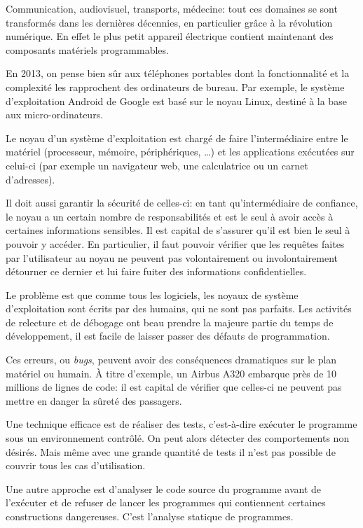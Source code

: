 Communication,
audiovisuel,
transports,
médecine:
tout ces domaines se sont transformés dans les dernières décennies,
en particulier grâce à la révolution numérique.
En effet le plus petit appareil électrique contient maintenant des composants
matériels programmables.

En 2013, on pense bien sûr aux téléphones portables dont la fonctionnalité et la
complexité les rapprochent des ordinateurs de bureau. Par exemple, le système
d'exploitation Android de Google est basé sur le noyau Linux, destiné à la base
aux micro-ordinateurs.

Le noyau d'un système d'exploitation est chargé de faire l'intermédiaire entre
le matériel (processeur, mémoire, périphériques, …) et les applications
exécutées sur celui-ci (par exemple un navigateur web, une calculatrice ou un
carnet d'adresses).

Il doit aussi garantir la sécurité de celles-ci: en tant qu'intermédiaire de
confiance, le noyau a un certain nombre de responsabilités et est le seul à
avoir accès à certaines informations sensibles. Il est capital de s'assurer
qu'il est bien le seul à pouvoir y accéder. En particulier, il faut pouvoir
vérifier que les requêtes faites par l'utilisateur au noyau ne peuvent pas
volontairement ou involontairement détourner ce dernier et lui faire fuiter des
informations confidentielles.

Le problème est que comme tous les logiciels, les noyaux de système
d'exploitation sont écrits par des humains, qui ne sont pas parfaits. Les
activités de relecture et de débogage ont beau prendre la majeure partie du
temps de développement, il est facile de laisser passer des défauts de
programmation.

Ces erreurs, ou \emph{bugs}, peuvent avoir des conséquences dramatiques sur le
plan matériel ou humain. À titre d'exemple, un Airbus A320 embarque près de 10
millions de lignes de code: il est capital de vérifier que celles-ci ne peuvent
pas mettre en danger la sûreté des passagers.

Une technique efficace est de réaliser des tests, c'est-à-dire exécuter le
programme sous un environnement contrôlé. On peut alors détecter des
comportements non désirés. Mais même avec une grande quantité de tests il n'est
pas possible de couvrir tous les cas d'utilisation.

Une autre approche est d'analyser le code source du programme avant de
l'exécuter et de refuser de lancer les programmes qui contiennent certaines
constructions dangereuses. C'est l'analyse statique de programmes.

